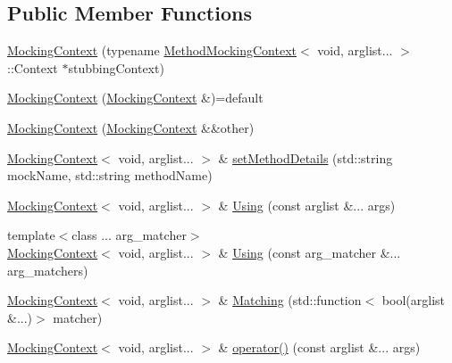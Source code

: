 \subsection*{Public Member Functions}
\begin{DoxyCompactItemize}
\item 
\mbox{\hyperlink{classfakeit_1_1MockingContext_3_01void_00_01arglist_8_8_8_01_4_a655f7e31674dfb282f30a94f31ffd2a7}{Mocking\+Context}} (typename \mbox{\hyperlink{classfakeit_1_1MethodMockingContext}{Method\+Mocking\+Context}}$<$ void, arglist... $>$\+::Context $\ast$stubbing\+Context)
\item 
\mbox{\hyperlink{classfakeit_1_1MockingContext_3_01void_00_01arglist_8_8_8_01_4_a750dcc8fb80a9931c41143ce73d7177c}{Mocking\+Context}} (\mbox{\hyperlink{classfakeit_1_1MockingContext}{Mocking\+Context}} \&)=default
\item 
\mbox{\hyperlink{classfakeit_1_1MockingContext_3_01void_00_01arglist_8_8_8_01_4_a1f7b3663809191b919290f0db05d59f1}{Mocking\+Context}} (\mbox{\hyperlink{classfakeit_1_1MockingContext}{Mocking\+Context}} \&\&other)
\item 
\mbox{\hyperlink{classfakeit_1_1MockingContext}{Mocking\+Context}}$<$ void, arglist... $>$ \& \mbox{\hyperlink{classfakeit_1_1MockingContext_3_01void_00_01arglist_8_8_8_01_4_a5479ea5b1a1f32898cc9592bfb1c7777}{set\+Method\+Details}} (std\+::string mock\+Name, std\+::string method\+Name)
\item 
\mbox{\hyperlink{classfakeit_1_1MockingContext}{Mocking\+Context}}$<$ void, arglist... $>$ \& \mbox{\hyperlink{classfakeit_1_1MockingContext_3_01void_00_01arglist_8_8_8_01_4_a0dad4e59214a5fdcacad0e4a170df071}{Using}} (const arglist \&... args)
\item 
{\footnotesize template$<$class ... arg\+\_\+matcher$>$ }\\\mbox{\hyperlink{classfakeit_1_1MockingContext}{Mocking\+Context}}$<$ void, arglist... $>$ \& \mbox{\hyperlink{classfakeit_1_1MockingContext_3_01void_00_01arglist_8_8_8_01_4_aaab0ad3883ab87bd3885671e3266546e}{Using}} (const arg\+\_\+matcher \&... arg\+\_\+matchers)
\item 
\mbox{\hyperlink{classfakeit_1_1MockingContext}{Mocking\+Context}}$<$ void, arglist... $>$ \& \mbox{\hyperlink{classfakeit_1_1MockingContext_3_01void_00_01arglist_8_8_8_01_4_a28152fc4e0105f5e6424515367a5d4c3}{Matching}} (std\+::function$<$ bool(arglist \&...)$>$ matcher)
\item 
\mbox{\hyperlink{classfakeit_1_1MockingContext}{Mocking\+Context}}$<$ void, arglist... $>$ \& \mbox{\hyperlink{classfakeit_1_1MockingContext_3_01void_00_01arglist_8_8_8_01_4_a73476d376f7ec5631ba9a37ff5264599}{operator()}} (const arglist \&... args)

\end{DoxyCompactItemize}
